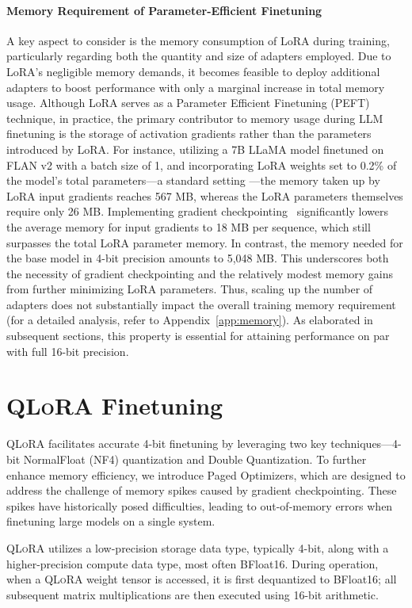 \paragraph{Memory Requirement of Parameter-Efficient Finetuning} A key aspect to consider is the memory consumption of LoRA during training, particularly regarding both the quantity and size of adapters employed. Due to LoRA’s negligible memory demands, it becomes feasible to deploy additional adapters to boost performance with only a marginal increase in total memory usage. Although LoRA serves as a Parameter Efficient Finetuning (PEFT) technique, in practice, the primary contributor to memory usage during LLM finetuning is the storage of activation gradients rather than the parameters introduced by LoRA. For instance, utilizing a 7B LLaMA model finetuned on FLAN v2 with a batch size of 1, and incorporating LoRA weights set to 0.2\% of the model’s total parameters—a standard setting \citep{hu2021lora,liu2022few}—the memory taken up by LoRA input gradients reaches 567 MB, whereas the LoRA parameters themselves require only 26 MB. Implementing gradient checkpointing~\citep{chen2016training} significantly lowers the average memory for input gradients to 18 MB per sequence, which still surpasses the total LoRA parameter memory. In contrast, the memory needed for the base model in 4-bit precision amounts to 5,048 MB. This underscores both the necessity of gradient checkpointing and the relatively modest memory gains from further minimizing LoRA parameters. Thus, scaling up the number of adapters does not substantially impact the overall training memory requirement (for a detailed analysis, refer to Appendix~\ref{app:memory}). As elaborated in subsequent sections, this property is essential for attaining performance on par with full 16-bit precision.

\section{\textsc{QLoRA} Finetuning}

\textsc{QLoRA} facilitates accurate 4-bit finetuning by leveraging two key techniques—4-bit NormalFloat (NF4) quantization and Double Quantization. To further enhance memory efficiency, we introduce Paged Optimizers, which are designed to address the challenge of memory spikes caused by gradient checkpointing. These spikes have historically posed difficulties, leading to out-of-memory errors when finetuning large models on a single system.

\textsc{QLoRA} utilizes a low-precision storage data type, typically 4-bit, along with a higher-precision compute data type, most often BFloat16. During operation, when a \textsc{QLoRA} weight tensor is accessed, it is first dequantized to BFloat16; all subsequent matrix multiplications are then executed using 16-bit arithmetic.


